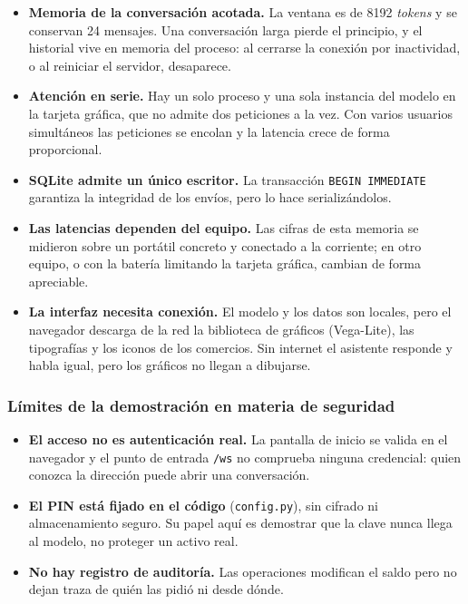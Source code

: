 \begin{itemize}
    \item \textbf{Memoria de la conversación acotada.} La ventana es de 8192
    \textit{tokens} y se conservan 24 mensajes. Una conversación larga pierde el
    principio, y el historial vive en memoria del proceso: al cerrarse la
    conexión por inactividad, o al reiniciar el servidor, desaparece.

    \item \textbf{Atención en serie.} Hay un solo proceso y una sola instancia
    del modelo en la tarjeta gráfica, que no admite dos peticiones a la vez. Con
    varios usuarios simultáneos las peticiones se encolan y la latencia crece de
    forma proporcional.

    \item \textbf{SQLite admite un único escritor.} La transacción
    \texttt{BEGIN IMMEDIATE} garantiza la integridad de los envíos, pero lo hace
    serializándolos.

    \item \textbf{Las latencias dependen del equipo.} Las cifras de esta memoria
    se midieron sobre un portátil concreto y conectado a la corriente; en otro
    equipo, o con la batería limitando la tarjeta gráfica, cambian de forma
    apreciable.

    \item \textbf{La interfaz necesita conexión.} El modelo y los datos son
    locales, pero el navegador descarga de la red la biblioteca de gráficos
    (Vega-Lite), las tipografías y los iconos de los comercios. Sin internet el
    asistente responde y habla igual, pero los gráficos no llegan a dibujarse.
\end{itemize}

\subsubsection{Límites de la demostración en materia de seguridad}

\begin{itemize}
    \item \textbf{El acceso no es autenticación real.} La pantalla de inicio se
    valida en el navegador y el punto de entrada \texttt{/ws} no comprueba
    ninguna credencial: quien conozca la dirección puede abrir una conversación.

    \item \textbf{El PIN está fijado en el código} (\texttt{config.py}), sin
    cifrado ni almacenamiento seguro. Su papel aquí es demostrar que la clave
    nunca llega al modelo, no proteger un activo real.

    \item \textbf{No hay registro de auditoría.} Las operaciones modifican el
    saldo pero no dejan traza de quién las pidió ni desde dónde.
\end{itemize}

